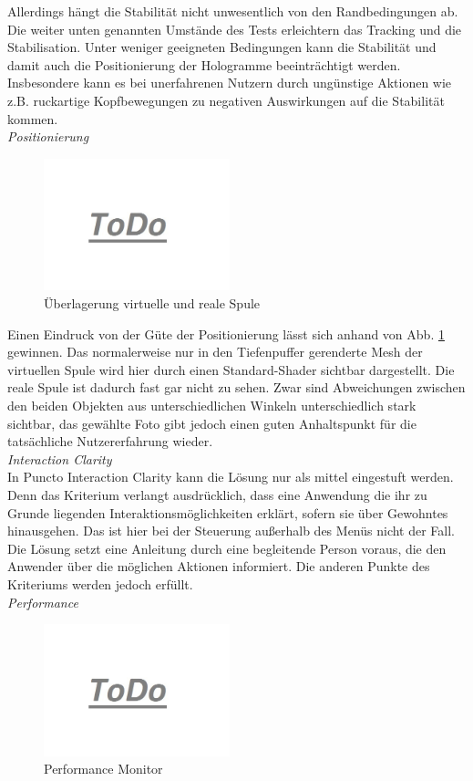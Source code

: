 Allerdings hängt die Stabilität nicht unwesentlich von den Randbedingungen ab. Die weiter unten genannten Umstände des Tests erleichtern das Tracking und die Stabilisation. Unter weniger geeigneten Bedingungen kann die Stabilität und damit auch die Positionierung der Hologramme beeinträchtigt werden. Insbesondere kann es bei unerfahrenen Nutzern durch ungünstige Aktionen wie z.B. ruckartige Kopfbewegungen zu negativen Auswirkungen auf die Stabilität kommen.\\

\textit{Positionierung}
\begin{figure}
	\centering
	\includegraphics[width=0.48\textwidth]{images/todo.jpg}
	\caption{Überlagerung virtuelle und reale Spule}
	\label{img:model-overlay}
\end{figure}
Einen Eindruck von der Güte der Positionierung lässt sich anhand von Abb. \ref{img:model-overlay} gewinnen. Das normalerweise nur in den Tiefenpuffer gerenderte Mesh der virtuellen Spule wird hier durch einen Standard-Shader sichtbar dargestellt. Die reale Spule ist dadurch fast gar nicht zu sehen. Zwar sind Abweichungen zwischen den beiden Objekten aus unterschiedlichen Winkeln unterschiedlich stark sichtbar, das gewählte Foto gibt jedoch einen guten Anhaltspunkt für die tatsächliche Nutzererfahrung wieder.\\

\textit{Interaction Clarity}\\
In Puncto Interaction Clarity kann die Lösung nur als mittel eingestuft werden. Denn das Kriterium verlangt ausdrücklich, dass eine Anwendung die ihr zu Grunde liegenden Interaktionsmöglichkeiten erklärt, sofern sie über Gewohntes hinausgehen. Das ist hier bei der Steuerung außerhalb des Menüs nicht der Fall. Die Lösung setzt eine Anleitung durch eine begleitende Person voraus, die den Anwender über die möglichen Aktionen informiert. Die anderen Punkte des Kriteriums werden jedoch erfüllt.\\

\textit{Performance}
\begin{figure}
	\centering
	\includegraphics[width=0.48\textwidth]{images/todo.jpg}
	\caption{Performance Monitor}
	\label{img:performance}
\end{figure}

